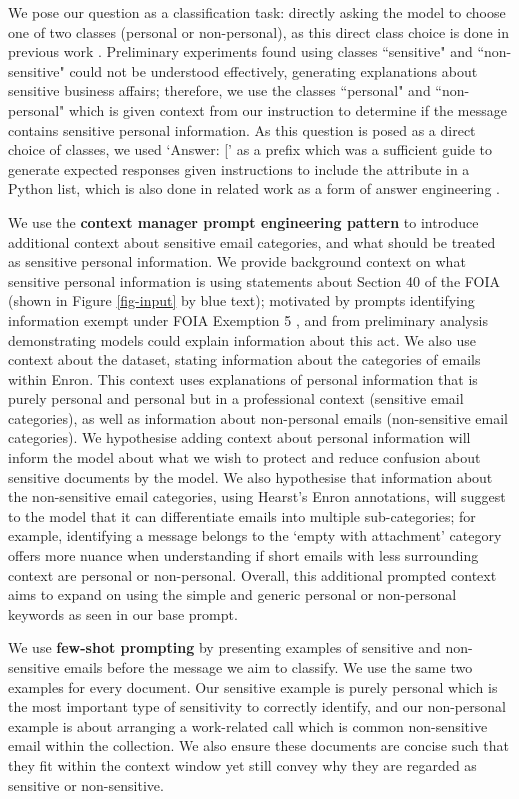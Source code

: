 We pose our question as a classification task: directly asking the model to choose one of two classes (personal or non-personal), as this direct class choice is done in previous work \cite{kocon2023chatgpt, puri2019zero}. Preliminary experiments found using classes ``sensitive" and ``non-sensitive" could not be understood effectively, generating explanations about sensitive business affairs; therefore, we use the classes ``personal" and ``non-personal" which is given context from our instruction to determine if the message contains sensitive personal information. As this question is posed as a direct choice of classes, we used `Answer: [' as a prefix which was a sufficient guide to generate expected responses given instructions to include the attribute in a Python list, which is also done in related work as a form of answer engineering \cite{kocon2023chatgpt}.

We use the \textbf{context manager prompt engineering pattern} to introduce additional context about sensitive email categories, and what should be treated as sensitive personal information. We provide background context on what sensitive personal information is using statements about Section 40 of the FOIA (shown in Figure \ref{fig-input} by blue text); motivated by prompts identifying information exempt under FOIA Exemption 5 \cite{baron2023using}, and from preliminary analysis demonstrating models could explain information about this act. We also use context about the dataset, stating information about the categories of emails within Enron. This context uses explanations of personal information that is purely personal and personal but in a professional context (sensitive email categories), as well as information about non-personal emails (non-sensitive email categories). We hypothesise adding context about personal information will inform the model about what we wish to protect and reduce confusion about sensitive documents by the model. We also hypothesise that information about the non-sensitive email categories, using Hearst’s Enron annotations, will suggest to the model that it can differentiate emails into multiple sub-categories; for example, identifying a message belongs to the ‘empty with attachment’ category offers more nuance when understanding if short emails with less surrounding context are personal or non-personal. Overall, this additional prompted context aims to expand on using the simple and generic personal or non-personal keywords as seen in our base prompt.

We use \textbf{few-shot prompting} by presenting examples of sensitive and non-sensitive emails before the message we aim to classify. We use the same two examples for every document. Our sensitive example is purely personal which is the most important type of sensitivity to correctly identify, and our non-personal example is about arranging a work-related call which is common non-sensitive email within the collection. We also ensure these documents are concise such that they fit within the context window yet still convey why they are regarded as sensitive or non-sensitive.

